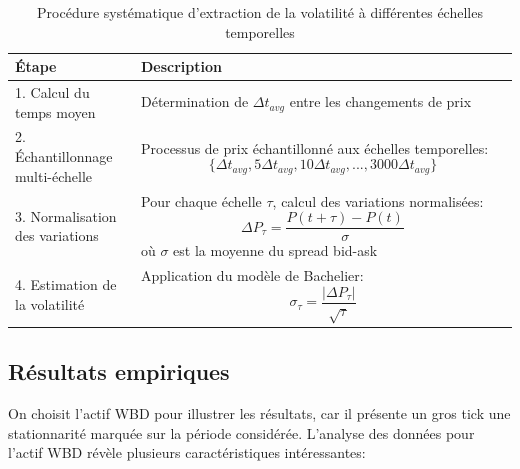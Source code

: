 \documentclass[10pt,a4paper]{article}
\theoremstyle{definition}
\theoremstyle{remark}
\begin{document}
\begin{itemize}
\begin{landscape}
\begin{table}[h!]
\centering
\begin{tabular}{|p{0.25\linewidth}|p{0.75\linewidth}|}
\hline
\textbf{Étape} & \textbf{Description} \\
\hline
1. Calcul du temps moyen & Détermination de \(\Delta t_{avg}\) entre les changements de prix \\
\hline
2. Échantillonnage multi-échelle & Processus de prix échantillonné aux échelles temporelles: \[\{\Delta t_{avg}, 5\Delta t_{avg}, 10\Delta t_{avg}, ..., 3000\Delta t_{avg}\}\] \\
\hline
3. Normalisation des variations & Pour chaque échelle \(\tau\), calcul des variations normalisées: \[\Delta P_{\tau} = \frac{P(t+\tau) - P(t)}{\sigma}\] où \(\sigma\) est la moyenne du spread bid-ask \\
\hline
4. Estimation de la volatilité & Application du modèle de Bachelier: \[\sigma_{\tau} = \frac{|\Delta P_{\tau}|}{\sqrt{\tau}}\] \\
\hline
\end{tabular}
\caption{Procédure systématique d'extraction de la volatilité à différentes échelles temporelles}
\label{tab:volatility_extraction}
\end{table}
\end{landscape}

\subsection{Résultats empiriques}

On choisit l'actif WBD pour illustrer les résultats, car il présente un gros tick une stationnarité marquée sur la période considérée.
L'analyse des données pour l'actif WBD révèle plusieurs caractéristiques intéressantes:


\end{itemize}
\end{document}
